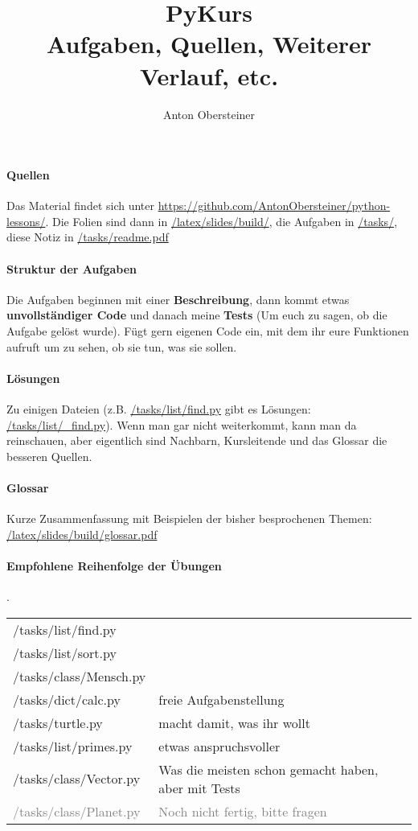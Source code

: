 \documentclass{article}
\title{PyKurs \\ \normalsize Aufgaben, Quellen, Weiterer Verlauf, etc.}
\author{Anton Obersteiner}
\begin{document}
\maketitle
\paragraph{Quellen}
	Das Material findet sich unter \url{https://github.com/AntonObersteiner/python-lessons/}.
	Die Folien sind dann in \url{/latex/slides/build/}, die Aufgaben in \url{/tasks/}, diese Notiz in \url{/tasks/readme.pdf}

\paragraph{Struktur der Aufgaben}
	Die Aufgaben beginnen mit einer \textbf{Beschreibung}, dann kommt etwas \textbf{unvollständiger Code} und danach meine \textbf{Tests} (Um euch zu sagen, ob die Aufgabe gelöst wurde). Fügt gern eigenen Code ein, mit dem ihr eure Funktionen aufruft um zu sehen, ob sie tun, was sie sollen.
\paragraph{Lösungen}
	Zu einigen Dateien (z.B. \url{/tasks/list/find.py} gibt es Lösungen: \url{/tasks/list/_find.py}). Wenn man gar nicht weiterkommt, kann man da reinschauen, aber eigentlich sind Nachbarn, Kursleitende und das Glossar die besseren Quellen.

\paragraph{Glossar}
	Kurze Zusammenfassung mit Beispielen der bisher besprochenen Themen: \url{/latex/slides/build/glossar.pdf}

\paragraph{Empfohlene Reihenfolge der Übungen} .\\
	\begin{tabular}{l|l}
		/tasks/list/find.py \\
		/tasks/list/sort.py \\
		/tasks/class/Mensch.py \\
		/tasks/dict/calc.py & freie Aufgabenstellung \\
		/tasks/turtle.py & macht damit, was ihr wollt \\
		/tasks/list/primes.py & etwas anspruchsvoller \\
		/tasks/class/Vector.py & Was die meisten schon gemacht haben, aber mit Tests \\
		\textcolor{gray}{/tasks/class/Planet.py} & \textcolor{gray}{Noch nicht fertig, bitte fragen} \\
	\end{tabular}
\end{document}
